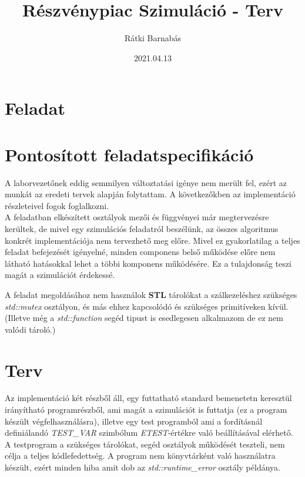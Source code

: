 \documentclass{article}[12pt,a4paper]
\title{Részvénypiac Szimuláció - Terv}
\author{Rátki Barnabás}
\date{2021.04.13}
\begin{document}
    \maketitle

    \tableofcontents

    \section{Feladat}\label{sec:feladat}
    

    \section{Pontosított feladatspecifikáció}\label{sec:pontositott-feladatspecifikacio}
    A laborvezetőnek eddig semmilyen változtatási igénye nem merült fel, ezért az munkát az eredeti tervek alapján folytattam.
    A következőkben az implementáció részleteivel fogok foglalkozni.\\

    A feladatban elkészített osztályok mezői és függvényei már megtervezésre kerültek, de mivel egy szimulációs feladatról beszélünk, az összes algoritmus konkrét implementációja nem tervezhető meg előre.
    Mivel ez gyakorlatilag a teljes feladat befejezését igényelné, minden componens belső működése előre nem látható hatásokkal lehet a többi komponens működésére.
    Ez a tulajdonság teszi magát a szimulációt érdekessé.

    A feladat megoldásához nem használok \textbf{STL} tárolókat a szálkezeléshez szükséges \textit{std::mutex} osztályon, és más ehhez kapcsolódó és szükséges primitíveken kívül.
    (Illetve még a \textit{std::function} segéd tipust is esedlegesen alkalmazom de ez nem valódi tároló.)

    \section{Terv}
    Az implementáció két részből áll, egy futtatható standard bemenetetn keresztül irányítható programrészből, ami magát a szimulációt is futtatja (ez a program készült végfelhasználásra), illetve egy test programból ami a fordításnál definiálandó \textit{TEST\_VAR} szimbólum \textit{ETEST}-értékre való beállításával elérhető.
    A testprogram a szükséges tárolókat, segéd osztályok működését teszteli, nem célja a teljes kódlefedettség.
    A program nem könyvtárként való használatra készült, ezért minden hiba amit dob az \textit{std::runtime\_error} osztály példánya.
    
\end{document}

